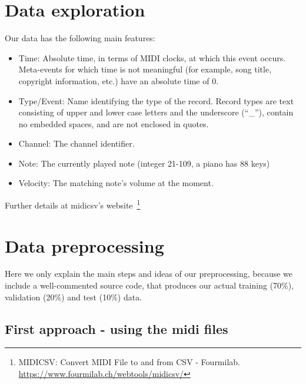 \documentclass{article}
\begin{document}
\section{Data exploration}
\label{sec:exploration}
Our data has the following main features:
\begin{itemize}
	\item Time: Absolute time, in terms of MIDI clocks, at which this event occurs. Meta-events
	for which time is not meaningful (for example, song title, copyright information, etc.)
	have an absolute time of 0.
	\item Type/Event: Name identifying the type of the record. Record types are text consisting
	of upper and lower case letters and the underscore (``\_''), contain no embedded
	spaces, and are not enclosed in quotes.
	\item Channel: The channel identifier.
	\item Note: The currently played note (integer 21-109, a piano has 88 keys)
	\item Velocity: The matching note’s volume at the moment.
\end{itemize}
Further details at midicsv’s website~\footnote{MIDICSV: Convert MIDI File to and from CSV - Fourmilab. \url{https://www.fourmilab.ch/webtools/midicsv/}}

\section{Data preprocessing}
Here we only explain the main steps and ideas of our preprocessing, because we include a well-commented source code, that produces our actual training (70\%), validation (20\%) and test (10\%) data.

\subsection{First approach - using the midi files}
\end{document}
